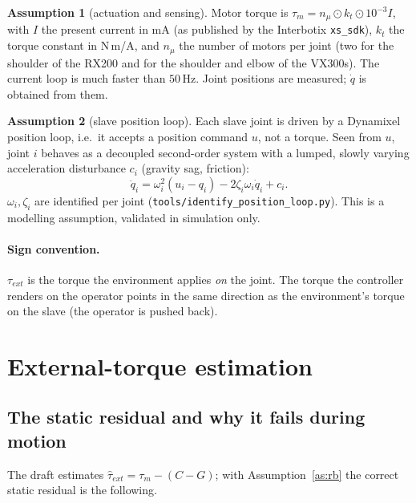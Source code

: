 \documentclass[11pt,a4paper]{article}
\theoremstyle{remark}
\theoremstyle{definition}
\newtheorem{assumption}{Assumption}
\begin{document}
\begin{assumption}[actuation and sensing]\label{as:act}
Motor torque is $\tau_m=n_\mu\odot k_t\odot10^{-3}I$, with $I$ the present current in mA (as published by the Interbotix
\texttt{xs\_sdk}), $k_t$ the torque constant in N\,m/A, and $n_\mu$ the number of motors per joint (two for the
shoulder of the RX200 and for the shoulder and elbow of the VX300s). The current loop is much faster than $50$\,Hz.
Joint positions are measured; $\dot q$ is obtained from them.
\end{assumption}

\begin{assumption}[slave position loop]\label{as:loop}
Each slave joint is driven by a Dynamixel position loop, i.e.\ it accepts a position command $u$, not a torque. Seen from $u$,
joint $i$ behaves as a decoupled second-order system with a lumped, slowly varying acceleration disturbance $c_i$
(gravity sag, friction):
\begin{equation}\label{eq:loop}
\ddot q_i=\omega_i^{2}(u_i-q_i)-2\zeta_i\omega_i\dot q_i+c_i .
\end{equation}
$\omega_i,\zeta_i$ are identified per joint (\texttt{tools/identify\_position\_loop.py}). This is a modelling assumption, validated
in simulation only.
\end{assumption}

\paragraph{Sign convention.}
$\tau_{ext}$ is the torque the environment applies \emph{on} the joint. The torque the controller renders on the operator
points in the same direction as the environment's torque on the slave (the operator is pushed back).

\section{External-torque estimation}\label{sec:obs}
\subsection{The static residual and why it fails during motion}
The draft estimates $\hat\tau_{ext}=\tau_m-(C-G)$; with Assumption~\ref{as:rb} the correct static residual is the following.
\end{document}
